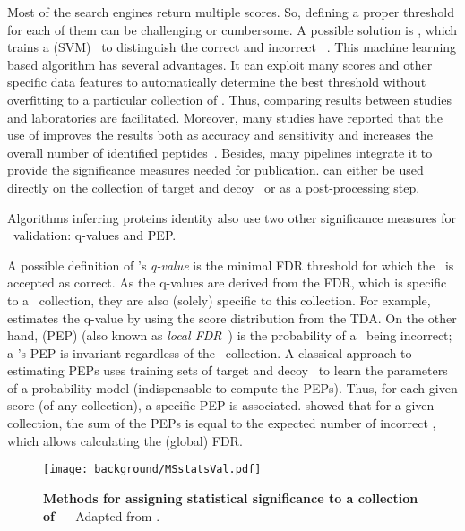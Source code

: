 Most of the search engines return multiple scores.
So, defining a proper threshold for each of them can be challenging or cumbersome.
A possible solution is ,
which trains a  (\gls{SVM})~
to distinguish the correct and incorrect \psms{}~.
This machine learning based algorithm has several advantages.
It can exploit many scores and other specific data features
to automatically determine the best threshold
without overfitting to a particular collection of \psms.
Thus, comparing results between studies and laboratories are facilitated.
Moreover, many studies have reported that the use of 
improves the results both as accuracy and sensitivity and
increases the overall number of identified peptides~.
Besides, many pipelines integrate it to provide
the significance measures needed for publication.
 can either be used directly on
the collection of target and decoy \psms\
or as a post-processing step.

\vspace{-0.7mm}
Algorithms inferring proteins identity also use
two other significance measures for \psm\ validation:
q-values and \gls{PEP}.

\vspace{-0.7mm}
A possible definition of \psm's \emph{q-value}\label{qvalP} is
the minimal \gls{FDR} threshold for which the \psm\ is accepted as correct.
As the q-values are derived from the \gls{FDR},
which is specific to a \psm\ collection,
they are also (solely) specific to this collection.
For example,
 estimates the q-value
by using the score distribution from the \gls{TDA}.
On the other hand,
 (\gls{PEP})\label{PEP}
(also known as \emph{local \gls{FDR}}~)
is the probability of a \psm\ being incorrect;
a \psm's \gls{PEP} is invariant regardless of the \psms\ collection.
A classical approach to estimating \glspl{PEP} uses
training sets of target and decoy \psms\ to learn the parameters
of a probability model (indispensable to compute the \glspl{PEP}).
Thus, for each given score (of any collection), a specific \gls{PEP} is associated.
\citet{Choi2008-ec} showed that for a given collection,
the sum of the \glspl{PEP} is equal to the expected number of incorrect \psms,
which allows calculating the (global) \gls{FDR}.

\begin{figure}[!htbp]
    \texttt{[image: background/MSstatsVal.pdf]}\centering
    \vspace{-3mm}
    \caption[Methods for assigning statistical significance]{\label{fig:MSstatval}%
    \textbf{Methods for assigning statistical significance to a collection of \psms}
   --- Adapted from \mycite{Kall2008-tf}.}
\end{figure}

